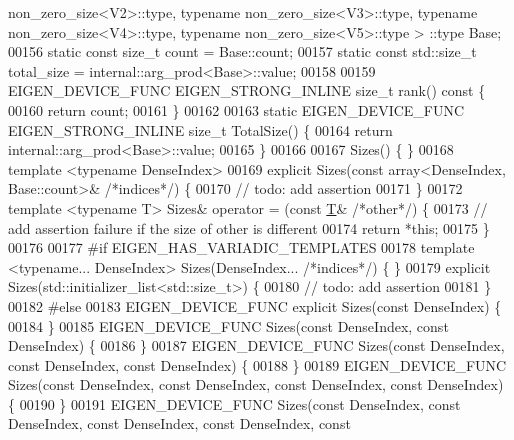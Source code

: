 \begin{DoxyCode}
      non\_zero\_size<V2>::type, \textcolor{keyword}{typename} non\_zero\_size<V3>::type, \textcolor{keyword}{typename} non\_zero\_size<V4>::type, \textcolor{keyword}{typename} non\_zero\_size<V5>::type >
      ::type Base;
00156   \textcolor{keyword}{static} \textcolor{keyword}{const} \textcolor{keywordtype}{size\_t} count = Base::count;
00157   \textcolor{keyword}{static} \textcolor{keyword}{const} std::size\_t total\_size = internal::arg\_prod<Base>::value;
00158 
00159   EIGEN\_DEVICE\_FUNC EIGEN\_STRONG\_INLINE \textcolor{keywordtype}{size\_t} rank()\textcolor{keyword}{ const }\{
00160     \textcolor{keywordflow}{return} count;
00161   \}
00162 
00163   \textcolor{keyword}{static} EIGEN\_DEVICE\_FUNC EIGEN\_STRONG\_INLINE \textcolor{keywordtype}{size\_t} TotalSize() \{
00164     \textcolor{keywordflow}{return} internal::arg\_prod<Base>::value;
00165   \}
00166 
00167   Sizes() \{ \}
00168   \textcolor{keyword}{template} <\textcolor{keyword}{typename} DenseIndex>
00169   \textcolor{keyword}{explicit} Sizes(\textcolor{keyword}{const} array<DenseIndex, Base::count>& \textcolor{comment}{/*indices*/}) \{
00170     \textcolor{comment}{// todo: add assertion}
00171   \}
00172   \textcolor{keyword}{template} <\textcolor{keyword}{typename} T> Sizes& operator = (\textcolor{keyword}{const} \hyperlink{group___sparse_core___module_class_eigen_1_1_triplet}{T}& \textcolor{comment}{/*other*/}) \{
00173     \textcolor{comment}{// add assertion failure if the size of other is different}
00174     \textcolor{keywordflow}{return} *\textcolor{keyword}{this};
00175   \}
00176 
00177 \textcolor{preprocessor}{#if EIGEN\_HAS\_VARIADIC\_TEMPLATES}
00178   \textcolor{keyword}{template} <\textcolor{keyword}{typename}... DenseIndex> Sizes(DenseIndex... \textcolor{comment}{/*indices*/}) \{ \}
00179   \textcolor{keyword}{explicit} Sizes(std::initializer\_list<std::size\_t>) \{
00180     \textcolor{comment}{// todo: add assertion}
00181   \}
00182 \textcolor{preprocessor}{#else}
00183   EIGEN\_DEVICE\_FUNC \textcolor{keyword}{explicit} Sizes(\textcolor{keyword}{const} DenseIndex) \{
00184   \}
00185   EIGEN\_DEVICE\_FUNC Sizes(\textcolor{keyword}{const} DenseIndex, \textcolor{keyword}{const} DenseIndex) \{
00186   \}
00187   EIGEN\_DEVICE\_FUNC Sizes(\textcolor{keyword}{const} DenseIndex, \textcolor{keyword}{const} DenseIndex, \textcolor{keyword}{const} DenseIndex) \{
00188   \}
00189   EIGEN\_DEVICE\_FUNC Sizes(\textcolor{keyword}{const} DenseIndex, \textcolor{keyword}{const} DenseIndex, \textcolor{keyword}{const} DenseIndex, \textcolor{keyword}{const} DenseIndex) \{
00190   \}
00191   EIGEN\_DEVICE\_FUNC Sizes(\textcolor{keyword}{const} DenseIndex, \textcolor{keyword}{const} DenseIndex, \textcolor{keyword}{const} DenseIndex, \textcolor{keyword}{const} DenseIndex, \textcolor{keyword}{const} 

\end{DoxyCode}
